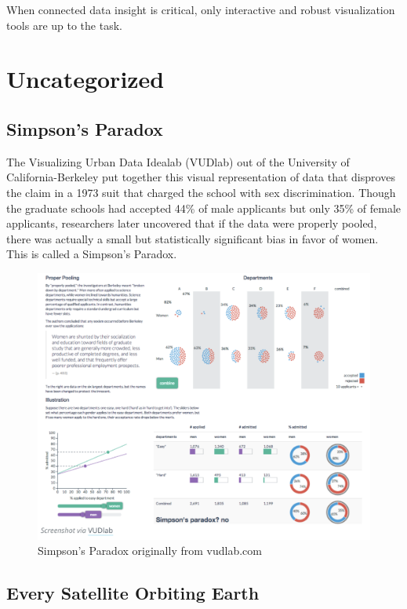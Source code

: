 \documentclass[]{book}
\theoremstyle{definition}
\theoremstyle{definition}
\theoremstyle{definition}
\theoremstyle{remark}
\begin{document}
When connected data insight is critical, only interactive and robust
visualization tools are up to the task.

\section{Uncategorized}\label{uncategorized}

\subsection{Simpson's Paradox}\label{simpsons-paradox}

The Visualizing Urban Data Idealab (VUDlab) out of the University of
California-Berkeley put together this visual representation of data that
disproves the claim in a 1973 suit that charged the school with sex
discrimination. Though the graduate schools had accepted 44\% of male
applicants but only 35\% of female applicants, researchers later
uncovered that if the data were properly pooled, there was actually a
small but statistically significant bias in favor of women. This is
called a Simpson's Paradox.

\begin{figure}
\centering
\includegraphics{images/VUD_simpsons.png}
\caption{Simpson's Paradox originally from vudlab.com}
\end{figure}

\subsection{Every Satellite Orbiting
Earth}\label{every-satellite-orbiting-earth}
\end{document}
